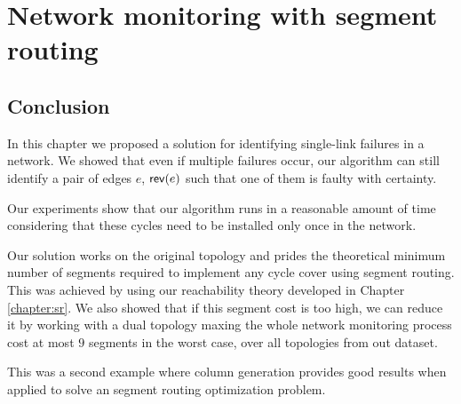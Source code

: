 \chapter{Network monitoring with segment routing}
\label{chapter:scmon}











\section*{Conclusion}

In this chapter we proposed a solution for identifying single-link failures in a network.
We showed that even if multiple failures occur, our algorithm can still identify a pair of 
edges $e$, $\mathsf{rev}(e)$ such that one of them is faulty with certainty.

Our experiments show that our algorithm runs in a reasonable amount of time considering that
these cycles need to be installed only once in the network. 

Our solution works on the original topology and prides the theoretical minimum number of segments
required to implement any cycle cover using segment routing. This was achieved by using our reachability
theory developed in Chapter \ref{chapter:sr}. We also showed that if this segment cost
is too high, we can reduce it by working with a dual topology maxing the whole network monitoring 
process cost at most $9$ segments in the worst case, over all topologies from out dataset.

This was a second example where column generation provides good results when applied to solve an
segment routing optimization problem.
